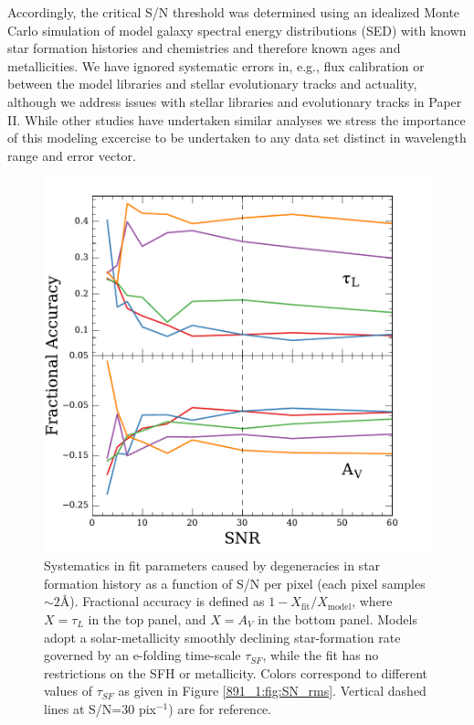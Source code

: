 Accordingly, the critical S/N threshold was determined using an
idealized Monte Carlo simulation of model galaxy spectral energy
distributions (SED) with known star formation histories and
chemistries and therefore known ages and metallicities.  We have
ignored systematic errors in, e.g., flux calibration or between the
model libraries and stellar evolutionary tracks and actuality,
although we address issues with stellar libraries and evolutionary
tracks in Paper II. While other studies have undertaken similar
analyses we stress the importance of this modeling excercise to be
undertaken to any data set distinct in wavelength range and error
vector.

\begin{figure}
  \centering
  \includegraphics[width=\columnwidth]{891_1/figs/SN_sys.pdf}

  \caption[Systematics in model galaxies used for S/N
  determination]{\label{891_1:fig:SN_sys}\fixspacing Systematics in fit
    parameters caused by degeneracies in star formation history as a
    function of S/N per pixel (each pixel samples $\sim 2$\AA).
    Fractional accuracy is defined as $1 -
    X_\mathrm{fit}/X_\mathrm{model}$, where $X = \tau_L$ in the top
    panel, and $X = A_V$ in the bottom panel.  Models adopt a
    solar-metallicity smoothly declining star-formation rate governed
    by an e-folding time-scale $\tau_{SF}$, while the fit has no
    restrictions on the SFH or metallicity. Colors correspond to
    different values of $\tau_{SF}$ as given in Figure
    \ref{891_1:fig:SN_rms}. Vertical dashed lines at S/N=30 pix$^{-1}$) are
    for reference.}
\end{figure}


